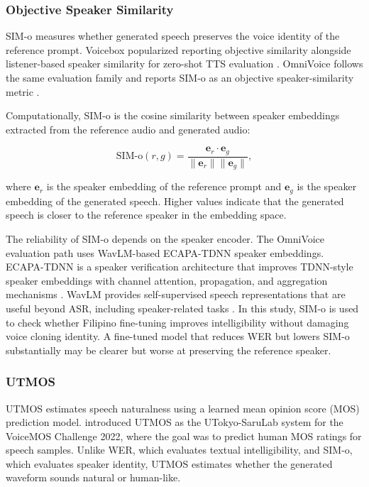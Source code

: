 \documentclass[11pt]{article}
\begin{document}
\subsubsection{Objective Speaker Similarity}

SIM-o measures whether generated speech preserves the voice identity of the reference prompt. Voicebox popularized reporting objective similarity alongside listener-based speaker similarity for zero-shot TTS evaluation \citep{voicebox}. OmniVoice follows the same evaluation family and reports SIM-o as an objective speaker-similarity metric \citep{omnivoice}.

Computationally, SIM-o is the cosine similarity between speaker embeddings extracted from the reference audio and generated audio:

\begin{equation}
  \mathrm{SIM\text{-}o}(r,g) =
  \frac{\mathbf{e}_r \cdot \mathbf{e}_g}
       {\lVert \mathbf{e}_r \rVert \lVert \mathbf{e}_g \rVert},
\end{equation}

where $\mathbf{e}_r$ is the speaker embedding of the reference prompt and $\mathbf{e}_g$ is the speaker embedding of the generated speech. Higher values indicate that the generated speech is closer to the reference speaker in the embedding space.

The reliability of SIM-o depends on the speaker encoder. The OmniVoice evaluation path uses WavLM-based ECAPA-TDNN speaker embeddings. ECAPA-TDNN is a speaker verification architecture that improves TDNN-style speaker embeddings with channel attention, propagation, and aggregation mechanisms \citep{ecapatdnn}. WavLM provides self-supervised speech representations that are useful beyond ASR, including speaker-related tasks \citep{wavlm}. In this study, SIM-o is used to check whether Filipino fine-tuning improves intelligibility without damaging voice cloning identity. A fine-tuned model that reduces WER but lowers SIM-o substantially may be clearer but worse at preserving the reference speaker.

\subsubsection{UTMOS}

UTMOS estimates speech naturalness using a learned mean opinion score (MOS) prediction model. \citet{utmos} introduced UTMOS as the UTokyo-SaruLab system for the VoiceMOS Challenge 2022, where the goal was to predict human MOS ratings for speech samples. Unlike WER, which evaluates textual intelligibility, and SIM-o, which evaluates speaker identity, UTMOS estimates whether the generated waveform sounds natural or human-like.
\end{document}
